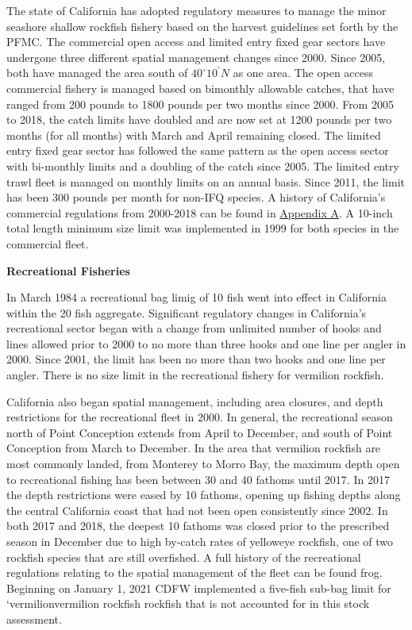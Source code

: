 \documentclass[11pt,
  english,
  a4paper,
]{article}
\begin{document}
The state of California has adopted regulatory measures to manage the minor seashore shallow rockfish fishery based on the harvest guidelines set forth by the PFMC. The commercial open access and limited entry fixed gear sectors have undergone three different spatial management changes since 2000. Since 2005, both have managed the area south of $40^\circ 10^\prime N$ as one area. The open access commercial fishery is managed based on bimonthly allowable catches, that have ranged from 200 pounds to 1800 pounds per two months since 2000. From 2005 to 2018, the catch limits have doubled and are now set at 1200 pounds per two months (for all months) with March and April remaining closed. The limited entry fixed gear sector has followed the same pattern as the open access sector with bi-monthly limits and a doubling of the catch since 2005. The limited entry trawl fleet is managed on monthly limits on an annual basis. Since 2011, the limit has been 300 pounds per month for non-IFQ species. A history of California's commercial regulations from 2000-2018 can be found in {\protect\hyperlink{appendix-a.-californias-commercial-fishery-regulations}{Appendix A}\leavevmode\tagmcend\tagstructend}. A 10-inch total length minimum size limit was implemented in 1999 for both species in the commercial fleet.

\textbf{Recreational Fisheries}

In March 1984 a recreational bag limig of 10 fish went into effect in California within the 20 fish aggregate. Significant regulatory changes in California's recreational sector began with a change from unlimited number of hooks and lines allowed prior to 2000 to no more than three hooks and one line per angler in 2000. Since 2001, the limit has been no more than two hooks and one line per angler. There is no size limit in the recreational fishery for vermilion rockfish.

California also began spatial management, including area closures, and depth restrictions for the recreational fleet in 2000. In general, the recreational season north of Point Conception extends from April to December, and south of Point Conception from March to December. In the area that vermilion rockfish are most commonly landed, from Monterey to Morro Bay, the maximum depth open to recreational fishing has been between 30 and 40 fathoms until 2017. In 2017 the depth restrictions were eased by 10 fathoms, opening up fishing depths along the central California coast that had not been open consistently since 2002. In both 2017 and 2018, the deepest 10 fathoms was closed prior to the prescribed season in December due to high by-catch rates of yelloweye rockfish, one of two rockfish species that are still overfished. A full history of the recreational regulations relating to the spatial management of the fleet can be found frog. Beginning on January 1, 2021 CDFW implemented a five-fish sub-bag limit for `vermilionvermilion rockfish rockfish that is not accounted for in this stock assessment.
\end{document}
